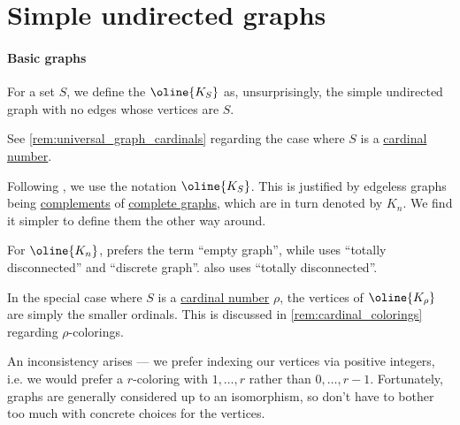 \section{Simple undirected graphs}\label{sec:simple_undirected_graphs}

\paragraph{Basic graphs}

\begin{definition}\label{def:edgeless_graph}\mimprovised
  For a set \( S \), we define the  \( \oline{K_S} \) as, unsurprisingly, the simple undirected graph with no edges whose vertices are \( S \).
\end{definition}
\begin{comments}
  \item See \cref{rem:universal_graph_cardinals} regarding the case where \( S \) is a \hyperref[def:cardinal]{cardinal number}.

  \item Following \textcite[16]{Harary1969GraphTheory}, we use the notation \( \oline{K_S} \). This is justified by edgeless graphs being \hyperref[def:graph_complement]{complements} of \hyperref[def:complete_graph]{complete graphs}, which are in turn denoted by \( K_n \). We find it simpler to define them the other way around.

  \item For \( \oline{K_n} \), \textcite[18]{Bollobás1998ModernGraphTheory} prefers the term \enquote{empty graph}, while \textcite[def. 1.3.1]{Knauer2019AlgebraicGraphTheory} uses \enquote{totally disconnected} and \enquote{discrete graph}. \Textcite[16]{Harary1969GraphTheory} also uses \enquote{totally disconnected}.
\end{comments}

\begin{remark}\label{rem:universal_graph_cardinals}
  In the special case where \( S \) is a \hyperref[def:cardinal]{cardinal number} \( \rho \), the vertices of \( \oline{K_\rho} \) are simply the smaller ordinals. This is discussed in \cref{rem:cardinal_colorings} regarding \( \rho \)-colorings.

  An inconsistency arises --- we prefer indexing our vertices via positive integers, i.e. we would prefer a \( r \)-coloring with \( 1, \ldots, r \) rather than \( 0, \ldots, r - 1 \). Fortunately, graphs are generally considered up to an isomorphism, so don't have to bother too much with concrete choices for the vertices.
\end{remark}

